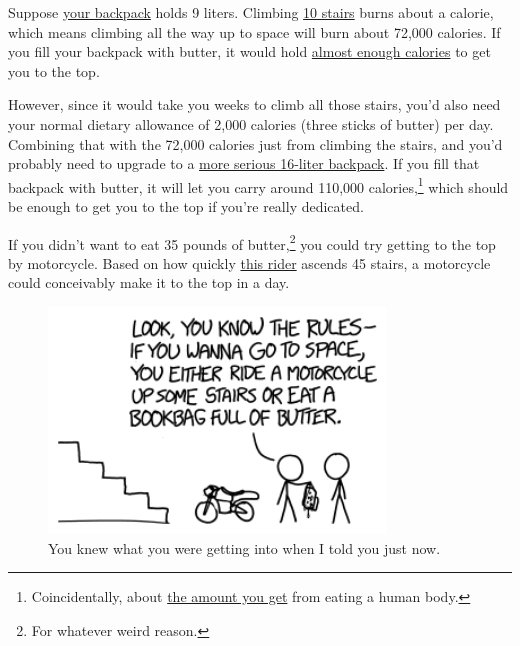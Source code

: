 {{Suppose \href{http://www.amazon.co.uk/Disney-Frozen-Childrens-Multicoloured-FROZEN001018/dp/B00O2EO8XU}{your backpack} holds 9 liters. Climbing \href{http://journals.lww.com/acsm-msse/pages/articleviewer.aspx?year=2002&issue=04000&article=00021&type=abstract}{10 stairs} burns about a calorie, which means climbing all the way up to space will burn about 72,000 calories. If you fill your backpack with butter, it would hold \href{http://www.wolframalpha.com/input/?i=9+liters+of+butter}{almost enough calories} to get you to the top.}

{However, since it would take you weeks to climb all those stairs, you'd also need your normal dietary allowance of 2,000 calories (three sticks of butter) per day. Combining that with the 72,000 calories just from climbing the stairs, and you'd probably need to upgrade to a \href{http://www.disneystore.com/anna-and-elsa-backpack-for-girls-personalizable/mp/1367267/1000290/}{more serious 16-liter backpack}. If you fill that backpack with butter, it will let you carry around 110,000 calories,{\footnote{Coincidentally, about \href{http://www.topatoco.com/merchant.mvc?Screen=PROD&Product\_Code=QW-PERSON}{the amount you get} from eating a human body.} } which should be enough to get you to the top if you're really dedicated.}

{If you didn't want to eat 35 pounds of butter,{\footnote{For whatever weird reason.} } you could try getting to the top by motorcycle. Based on how quickly \href{https://www.youtube.com/watch?v=k8CZiqEjQDk}{this rider} ascends 45 stairs, a motorcycle could conceivably make it to the top in a day.}

\begin{figure}[!htbp]
\centering
\includegraphics[scale=0.5, max width=0.8\textwidth]{imgs/a/126/options.png}
\caption{You knew what you were getting into when I told you just now.}
\end{figure}

}
